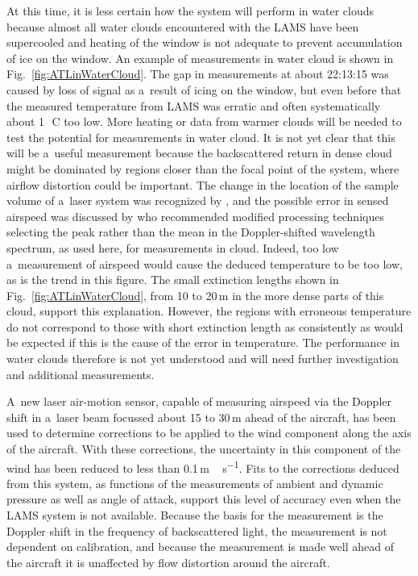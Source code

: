 \documentclass[amtd, online, hvmath]{copernicus}
\begin{document}
At this time, it is less certain how the system will perform in water
clouds because almost all water clouds encountered with the LAMS have
been supercooled and heating of the window is not adequate to prevent
accumulation of ice on the window. An example of measurements in water
cloud is shown in Fig.~\ref{fig:ATLinWaterCloud}. The gap in
measurements at about 22:13:15 was caused by loss of signal as
a~result of icing on the window, but even before that the measured
temperature from LAMS was erratic and often systematically about
1\,\unit{{\degree}C} too low. More heating or data from warmer clouds
will be needed to test the potential for measurements in water
cloud. It is not yet clear that this will be a~useful measurement
because the backscattered return in dense cloud might be dominated by
regions closer than the focal point of the system, where airflow
distortion could be important.  The change in the location of the
sample volume of a~laser system was recognized by \citet{Werner:84},
and the possible error in sensed airspeed was discussed by
\citet{KeelerEtAl1987} who recommended modified processing techniques
selecting the peak rather than the mean in the Doppler-shifted
wavelength spectrum, as used here, for measurements in cloud. Indeed,
too low a~measurement of airspeed would cause the deduced temperature
to be too low, as is the trend in this figure. The small extinction
lengths shown in Fig.~\ref{fig:ATLinWaterCloud}, from 10 to 20\,m in
the more dense parts of this cloud, support this explanation. However,
the regions with erroneous temperature do not correspond to those with
short extinction length as consistently as would be expected if this
is the cause of the error in temperature.  The performance in water
clouds therefore is not yet understood and will need further
investigation and additional measurements.


A~new laser air-motion sensor, capable of measuring airspeed via the
Doppler shift in a~laser beam focussed about 15 to 30\,m ahead of the
aircraft, has been used to determine corrections to be applied to the
wind component along the axis of the aircraft. With these corrections,
the uncertainty in this component of the wind has been reduced to less
than 0.1\,\unit{m\,s^{-1}}. Fits to the corrections deduced from this
system, as functions of the measurements of ambient and dynamic
pressure as well as angle of attack, support this level of accuracy
even when the LAMS system is not available. Because the basis for the
measurement is the Doppler shift in the frequency of backscattered
light, the measurement is not dependent on calibration, and because
the measurement is made well ahead of the aircraft it is unaffected by
flow distortion around the aircraft.
\end{document}
